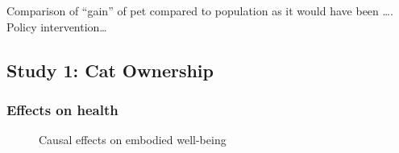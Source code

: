 \documentclass[
  singlecolumn,
  9pt]{article}
\begin{document}
Comparison of ``gain'' of pet compared to population as it would have
been \ldots. Policy intervention\ldots{}

\newpage{}

\subsection{Study 1: Cat Ownership}\label{study-1-cat-ownership}

\subsubsection{Effects on health}\label{effects-on-health}

\begin{figure}


\caption{\label{fig-results-health-cats}Causal effects on embodied
well-being}

\end{figure}%

\newpage{}
\end{document}
